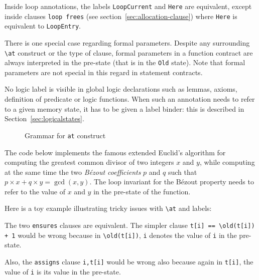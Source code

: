 Inside loop annotations, the labels \lstinline|LoopCurrent| and
\lstinline|Here| are equivalent,
except inside clauses \lstinline|loop frees|
(see section~\ref{sec:allocation-clause})
where \lstinline|Here| is equivalent to \lstinline|LoopEntry|.

There is one special case regarding formal parameters.
Despite any surrounding \lstinline|\at| construct or the
type of clause, formal
parameters in a function contract are always interpreted
in the pre-state (that is in the \lstinline|Old| state).
Note that formal parameters are not special in this regard in
statement contracts.

No logic label is visible in global logic declarations
such as lemmas, axioms, definition of predicate or logic
functions. When such an annotation needs to refer to a given memory
state, it has to be given a label binder: this is described in
Section~\ref{sec:logicalstates}.

\begin{figure}[htp]
  \begin{cadre}
    
  \end{cadre}
  \caption{Grammar for \lstinline|at| construct}
  \label{fig:gram:at}
\end{figure}


\begin{example}
  The code below implements the famous extended Euclid's algorithm
  for computing the greatest common divisor of two integers $x$ and
  $y$, while computing at the same time the two \emph{B\'ezout coefficients} $p$
  and $q$ such that $p\times x+q\times y = \gcd(x,y)$.
  The loop invariant for the B\'ezout property needs to refer to the
  value of $x$ and $y$ in the pre-state of the function.
\end{example}

\begin{example}
  Here is a toy example illustrating tricky issues with \lstinline|\at| and
  labels:


  The two \lstinline|ensures| clauses are equivalent. The simpler clause
  \lstinline|t[i] == \old(t[i]) + 1| would be wrong because in
  \lstinline|\old(t[i])|, \lstinline|i| denotes the value of \texttt{i} in the
  pre-state.

  Also, the \lstinline|assigns| clause \lstinline|i,t[i]| would be
  wrong also because again in \lstinline|t[i]|, the value of \texttt{i} is
  its value in the pre-state.

\end{example}

